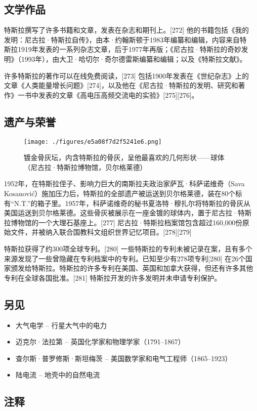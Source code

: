 \subsection{文学作品}  
特斯拉撰写了许多书籍和文章，发表在杂志和期刊上。[272] 他的书籍包括《我的发明：尼古拉·特斯拉自传》，由本·约翰斯顿于1983年编纂和编辑，内容来自特斯拉1919年发表的一系列杂志文章，后于1977年再版；《尼古拉·特斯拉的奇妙发明》（1993年），由大卫·哈切尔·奇尔德雷斯编纂和编辑；以及《特斯拉文献》。

许多特斯拉的著作可以在线免费阅读，[273] 包括1900年发表在《世纪杂志》上的文章《人类能量增长问题》[274]，以及他在《尼古拉·特斯拉的发明、研究和著作》一书中发表的文章《高电压高频交流电的实验》[275][276]。
\subsection{遗产与荣誉}
\begin{figure}[ht]
\centering
\texttt{[image: ./figures/e5a08f7d2f5241e6.png]}
\caption{镀金骨灰坛，内含特斯拉的骨灰，呈他最喜欢的几何形状——球体（尼古拉·特斯拉博物馆，贝尔格莱德）} \label{fig_Tesla_25}
\end{figure}
1952年，在特斯拉侄子、影响力巨大的南斯拉夫政治家萨瓦·科萨诺维奇（Sava Kosanović）施加压力后，特斯拉的全部遗产被运送到贝尔格莱德，装在80个标有“N.T.”的箱子里。1957年，科萨诺维奇的秘书夏洛特·穆扎尔将特斯拉的骨灰从美国运送到贝尔格莱德。这些骨灰被展示在一座金镀的球体内，置于尼古拉·特斯拉博物馆的一个大理石基座上。[277] 尼古拉·特斯拉档案馆包含超过160,000份原始文件，并被纳入联合国教科文组织世界记忆项目。[278][279]

特斯拉获得了约300项全球专利。[280] 一些特斯拉的专利未被记录在案，且有多个来源发现了一些曾隐藏在专利档案中的专利。已知至少有278项专利[280] 在26个国家颁发给特斯拉。特斯拉的许多专利在美国、英国和加拿大获得，但还有许多其他专利在全球各国批准。[281] 特斯拉开发的许多发明并未申请专利保护。
\subsection{另见}  
\begin{itemize}
\item 大气电学 – 行星大气中的电力  
\item 迈克尔·法拉第 – 英国化学家和物理学家（1791–1867）  
\item 查尔斯·普罗修斯·斯坦梅茨 – 美国数学家和电气工程师（1865–1923）  
\item 陆电流 – 地壳中的自然电流
\end{itemize}
\subsection{注释}  
